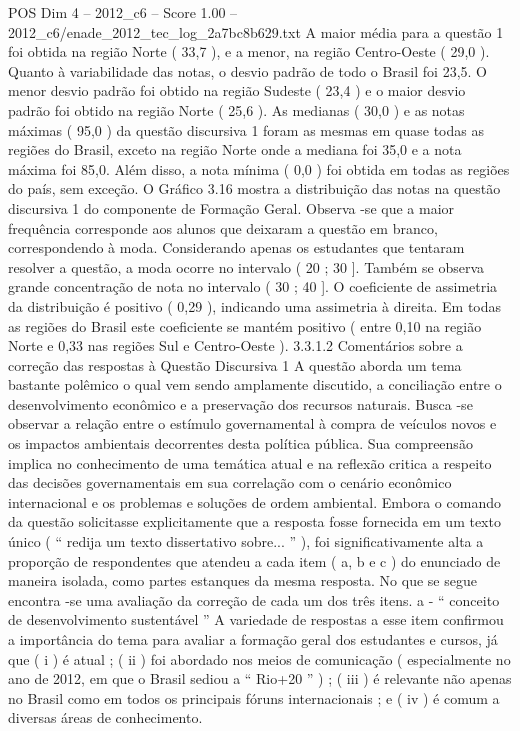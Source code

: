 \begin{textsample}{POS Dim 4 – 2012\_c6 – Score 1.00 – 2012\_c6/enade\_2012\_tec\_log\_2a7bc8b629.txt}
A maior média para a questão 1 foi obtida na região Norte ( 33,7 ), e a menor, na região Centro-Oeste ( 29,0 ).
Quanto à variabilidade das notas, o desvio padrão de todo o Brasil foi 23,5.
O menor desvio padrão foi obtido na região Sudeste ( 23,4 ) e o maior desvio padrão foi obtido na região Norte ( 25,6 ).
As medianas ( 30,0 ) e as notas máximas ( 95,0 ) da questão discursiva 1 foram as mesmas em quase todas as regiões do Brasil, exceto na região Norte onde a mediana foi 35,0 e a nota máxima foi 85,0.
Além disso, a nota mínima ( 0,0 ) foi obtida em todas as regiões do país, sem exceção.
O Gráfico 3.16 mostra a distribuição das notas na questão discursiva 1 do componente de Formação Geral.
Observa -se que a maior frequência corresponde aos alunos que deixaram a questão em branco, correspondendo à moda.
Considerando apenas os estudantes que tentaram resolver a questão, a moda ocorre no intervalo ( 20 ; 30 ].
Também se observa grande concentração de nota no intervalo ( 30 ; 40 ].
O coeficiente de assimetria da distribuição é positivo ( 0,29 ), indicando uma assimetria à direita.
Em todas as regiões do Brasil este coeficiente se mantém positivo ( entre 0,10 na região Norte e 0,33 nas regiões Sul e Centro-Oeste ). 3.3.1.2 Comentários sobre a correção das respostas à Questão Discursiva 1 A questão aborda um tema bastante polêmico o qual vem sendo amplamente discutido, a conciliação entre o desenvolvimento econômico e a preservação dos recursos naturais.
Busca -se observar a relação entre o estímulo governamental à compra de veículos novos e os impactos ambientais decorrentes desta política pública.
Sua compreensão implica no conhecimento de uma temática atual e na reflexão critica a respeito das decisões governamentais em sua correlação com o cenário econômico internacional e os problemas e soluções de ordem ambiental.
Embora o comando da questão solicitasse explicitamente que a resposta fosse fornecida em um texto único ( “ redija um texto dissertativo sobre... ” ), foi significativamente alta a proporção de respondentes que atendeu a cada item ( a, b e c ) do enunciado de maneira isolada, como partes estanques da mesma resposta.
No que se segue encontra -se uma avaliação da correção de cada um dos três itens. a - “ conceito de desenvolvimento sustentável ” A variedade de respostas a esse item confirmou a importância do tema para avaliar a formação geral dos estudantes e cursos, já que ( i ) é atual ; ( ii ) foi abordado nos meios de comunicação ( especialmente no ano de 2012, em que o Brasil sediou a “ Rio+20 ” ) ; ( iii ) é relevante não apenas no Brasil como em todos os principais fóruns internacionais ; e ( iv ) é comum a diversas áreas de conhecimento.

\end{textsample}

